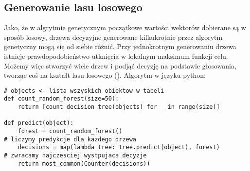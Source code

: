 \documentclass[magisterska]{pracamgr}
\theoremstyle{plain}
\theoremstyle{definition}
\theoremstyle{remark}
\begin{document}
\subsection{Generowanie lasu losowego}
Jako, że w algrytmie genetycznym początkowe wartości wektorów dobierane są w sposób losowy, 
drzewa decyzyjne generowane kilkukrotnie przez algorytm genetyczny mogą się od siebie różnić.
Przy jednokrotnym generowaniu drzewa istnieje prawdopodobieństwo utknięcia w lokalnym maksimum funkcji celu.
Możemy więc stworzyć wiele drzew i podjąć decyzję na podstawie głosowania, tworząc coś na kształt lasu losowego (\cite{RandomForest}).
Algorytm w języku python:
\begin{lstlisting}
# objects <- lista wszyskich obiektow w tabeli
def count_random_forest(size=50):	
	return [count_decision_tree(objects) for _ in range(size)]
      
def predict(object):
	forest = count_random_forest()
# liczymy predykcje dla kazdego drzewa
	decisions = map(lambda tree: tree.predict(object), forest)
# zwracamy najczesciej wystpujaca decyzje
	return most_common(Counter(decisions))		
\end{lstlisting}
\end{document}

